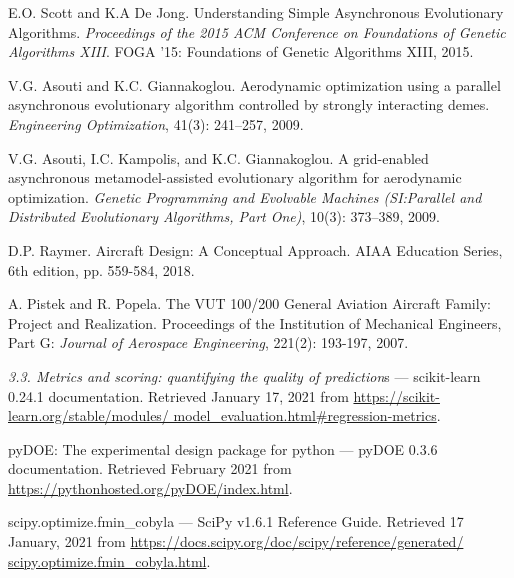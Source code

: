 \documentclass[twoside, 12pt,notitlepage]{report}
\begin{document}
\begin{thebibliography}{9}
E.O. Scott and K.A De Jong. Understanding Simple 
Asynchronous Evolutionary Algorithms. \textit{Proceedings 
of the 2015 ACM Conference on Foundations of Genetic 
Algorithms XIII}. FOGA ’15: Foundations of Genetic 
Algorithms XIII, 2015.

V.G. Asouti and K.C. Giannakoglou. Aerodynamic 
optimization using a parallel asynchronous evolutionary 
algorithm controlled by strongly interacting demes. 
\textit{Engineering Optimization}, 41(3): 241–257, 2009.

V.G. Asouti, I.C. Kampolis, and K.C. Giannakoglou. A 
grid-enabled asynchronous metamodel-assisted evolutionary 
algorithm for aerodynamic optimization. \textit{Genetic
Programming and Evolvable Machines (SI:Parallel and 
Distributed Evolutionary Algorithms, Part One)}, 
10(3): 373–389, 2009.

 
D.P. Raymer. Aircraft Design: A Conceptual Approach. AIAA 
Education Series, 6th edition, pp. 559-584, 2018. 

A. Pistek and R. Popela. The VUT 100/200 General 
Aviation Aircraft Family: Project and Realization. 
Proceedings of the Institution of Mechanical Engineers, 
Part G: \textit{Journal of Aerospace Engineering}, 221(2): 
193-197, 2007.

\textit{3.3. Metrics and scoring: quantifying the quality 
of prediction}s — scikit-learn 0.24.1 documentation. 
Retrieved January 17, 2021 from 
\url{https://scikit-learn.org/stable/modules/
model_evaluation.html#regression-metrics}.

pyDOE: The experimental design package for python — pyDOE 
0.3.6 documentation. Retrieved February 2021 from 
\url{https://pythonhosted.org/pyDOE/index.html}.

scipy.optimize.fmin\_cobyla — SciPy v1.6.1 Reference 
Guide. Retrieved 17 January, 2021 from 
\url{https://docs.scipy.org/doc/scipy/reference/generated/
scipy.optimize.fmin_cobyla.html}.

\end{thebibliography}

\newpage


\end{document}
